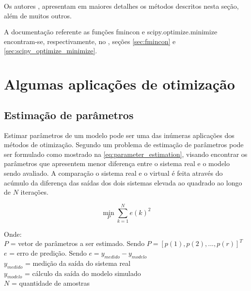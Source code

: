 Os autores ,  apresentam em maiores detalhes
os métodos descritos nesta seção, além de muitos outros.

A documentação referente as funções fmincon e scipy.optimize.minimize encontram-se, respectivamente,
no , seções \ref{sec:fmincon} e \ref{sec:scipy_optimize_minimize}.

\section{Algumas aplicações de otimização}
\label{sec:aplicacoes_de_otimizacao}

\subsection{Estimação de parâmetros}
\label{subsec:estimacao_de_parametros}

Estimar parâmetros de um modelo pode ser uma das inúmeras aplicações dos métodos de otimização.
Segundo  um problema de estimação de parâmetros pode ser formulado
como mostrado na \cref{eq:parameter_estimation}, visando encontrar os parâmetros que
apresentem menor diferença entre o sistema real e o modelo sendo avaliado.
A comparação o sistema real e o virtual é feita através do acúmulo da diferença das saídas dos
dois sistemas elevada ao quadrado ao longo de $N$ iterações.

\begin{equation}
	\label{eq:parameter_estimation}
	\min_{P} \sum_{k=1}^{N} e(k)^2
\end{equation}

\noindent
Onde: \\
$P$ = vetor de parâmetros a ser estimado. Sendo $ P = [p(1), p(2), ..., p(r)]^T $ \\
$e$ = erro de predição. Sendo $ e = y_{medido} - y_{modelo} $ \\
$ y_{medido} $ = medição da saída do sistema real \\
$ y_{modelo} $ = cálculo da saída do modelo simulado \\
$ N $ = quantidade de amostras
\newline

